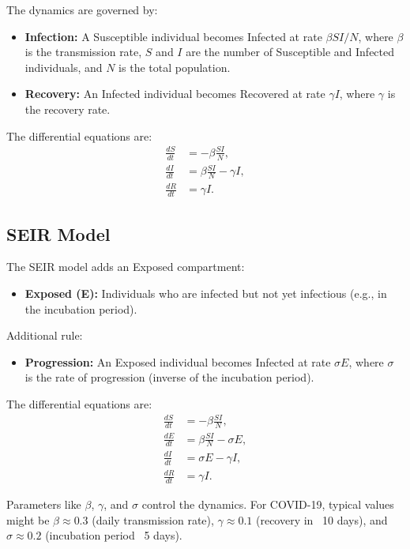 \documentclass{article}
\begin{document}
The dynamics are governed by:
\begin{itemize}
    \item \textbf{Infection:} A Susceptible individual becomes Infected at rate $\beta SI/N$, where $\beta$ is the transmission rate, $S$ and $I$ are the number of Susceptible and Infected individuals, and $N$ is the total population.
    \item \textbf{Recovery:} An Infected individual becomes Recovered at rate $\gamma I$, where $\gamma$ is the recovery rate.
\end{itemize}

The differential equations are:
\begin{align}
    \frac{dS}{dt} &= -\beta \frac{SI}{N}, \\
    \frac{dI}{dt} &= \beta \frac{SI}{N} - \gamma I, \\
    \frac{dR}{dt} &= \gamma I.
\end{align}

\subsection{SEIR Model}
The SEIR model adds an Exposed compartment:
\begin{itemize}
    \item \textbf{Exposed (E):} Individuals who are infected but not yet infectious (e.g., in the incubation period).
\end{itemize}

Additional rule:
\begin{itemize}
    \item \textbf{Progression:} An Exposed individual becomes Infected at rate $\sigma E$, where $\sigma$ is the rate of progression (inverse of the incubation period).
\end{itemize}

The differential equations are:
\begin{align}
    \frac{dS}{dt} &= -\beta \frac{SI}{N}, \\
    \frac{dE}{dt} &= \beta \frac{SI}{N} - \sigma E, \\
    \frac{dI}{dt} &= \sigma E - \gamma I, \\
    \frac{dR}{dt} &= \gamma I.
\end{align}

Parameters like $\beta$, $\gamma$, and $\sigma$ control the dynamics. For COVID-19, typical values might be $\beta \approx 0.3$ (daily transmission rate), $\gamma \approx 0.1$ (recovery in ~10 days), and $\sigma \approx 0.2$ (incubation period ~5 days).
\end{document}
